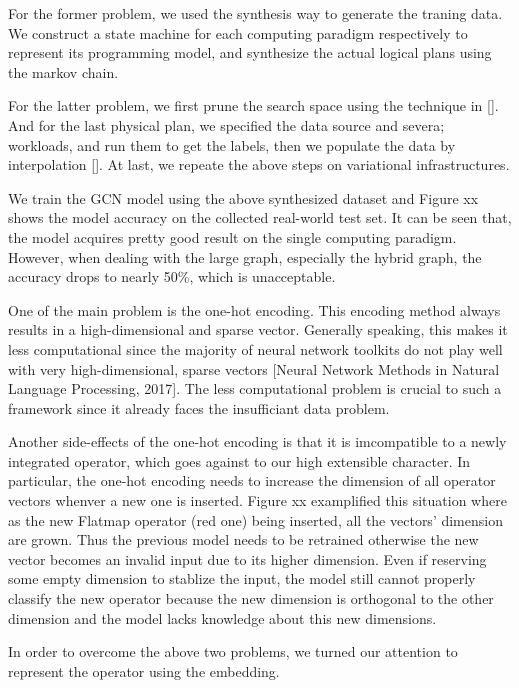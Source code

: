 For the former problem, we used the synthesis way to generate the traning data. 
We construct a state machine for each computing paradigm respectively to represent its programming model, and synthesize the actual logical plans using the markov chain. 

For the latter problem, we first prune the search space using the technique in []. 
And for the last physical plan, we specified the data source and severa; workloads, and run them to get the labels, then we populate the data by interpolation []. 
At last, we repeate the above steps on variational infrastructures.

We train the GCN model using the above synthesized dataset and Figure xx shows the model accuracy on the collected real-world test set. 
It can be seen that, the model acquires pretty good result on the single computing paradigm. 
However, when dealing with the large graph, especially the hybrid graph, the accuracy drops to nearly 50\%, which is unacceptable.

One of the main problem is the one-hot encoding. 
This encoding method always results in a high-dimensional and sparse vector. 
Generally speaking, this makes it less computational since the majority of neural network toolkits do not play well with very high-dimensional, sparse vectors [Neural Network Methods in Natural Language Processing, 2017]. 
The less computational problem is crucial to such a framework since it already faces the insufficiant data problem. 

Another side-effects of the one-hot encoding is that it is imcompatible to a newly integrated operator, which goes against to our high extensible character. 
In particular, the one-hot encoding needs to increase the dimension of all operator vectors whenver a new one is inserted. 
Figure xx examplified this situation where as the new Flatmap operator (red one) being inserted, all the vectors' dimension are grown. 
Thus the previous model needs to be retrained otherwise the new vector becomes an invalid input due to its higher dimension. 
Even if reserving some empty dimension to stablize the input, the model still cannot properly classify the new operator because the new dimension is orthogonal to the other dimension and the model lacks knowledge about this new dimensions.

In order to overcome the above two problems, we turned our attention to represent the operator using the embedding.




